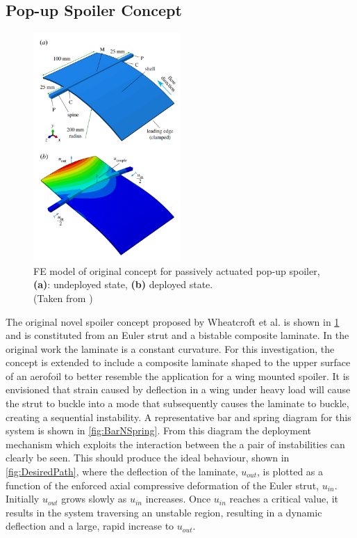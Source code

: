 \documentclass{IEEEtran}
\begin{document}
		\subsection{Pop-up Spoiler Concept}
		\begin{figure}[!h]
            \captionsetup{justification=centering}
			\centering{}
			\includegraphics[width=0.5\textwidth]{IntroductionImages/Concept.png}
            \caption{FE model of original concept for passively actuated pop-up spoiler, \textbf{(a)}: undeployed state, \textbf{(b)} deployed state. \\ (Taken from \cite{Wheatcroft_2023})}
			\label{fig:OGConcept}
		\end{figure}
	
		The original novel spoiler concept proposed by Wheatcroft et al. is shown in \cref{fig:OGConcept} and is constituted from an Euler strut and a bistable composite laminate. In the original work the laminate is a constant curvature. For this investigation, the concept is extended to include a composite laminate shaped to the upper surface of an aerofoil to better resemble the application for a wing mounted spoiler. It is envisioned that strain caused by deflection in a wing under heavy load will cause the strut to buckle into a mode that subsequently causes the laminate to buckle, creating a sequential instability. A representative bar and spring diagram for this system is shown in \cref{fig:BarNSpring}. From this diagram the deployment mechanism which exploits the  interaction between the a pair of instabilities can clearly be seen. This should produce the ideal behaviour, shown in \cref{fig:DesiredPath}, where the deflection of the laminate, $u_{out}$, is plotted as a function of the enforced axial compressive deformation of the Euler strut, $u_{in}$. Initially $u_{out}$ grows slowly as $u_{in}$ increases. Once $u_{in}$  reaches a critical value, it results in the system traversing an unstable region, resulting in a dynamic deflection and a large, rapid increase to $u_{out}$.
\end{document}
